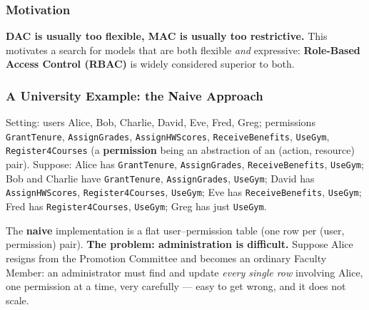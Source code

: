 \documentclass[12pt, a4paper]{article}
\begin{document}
\subsubsection{Motivation}
\textcolor{blue!50!black}{\textbf{DAC is usually too flexible, MAC is usually too restrictive.}} This motivates a search for models that are both flexible \emph{and} expressive: \textbf{Role-Based Access Control (RBAC)} is widely considered superior to both.

\subsubsection{A University Example: the Naive Approach}
Setting: users Alice, Bob, Charlie, David, Eve, Fred, Greg; permissions \texttt{GrantTenure}, \texttt{AssignGrades}, \texttt{AssignHWScores}, \texttt{ReceiveBenefits}, \texttt{UseGym}, \texttt{Register4Courses} (a \textbf{permission} being an abstraction of an (action, resource) pair). Suppose: Alice has \texttt{GrantTenure}, \texttt{AssignGrades}, \texttt{ReceiveBenefits}, \texttt{UseGym}; Bob and Charlie have \texttt{GrantTenure}, \texttt{AssignGrades}, \texttt{UseGym}; David has \texttt{AssignHWScores}, \texttt{Register4Courses}, \texttt{UseGym}; Eve has \texttt{ReceiveBenefits}, \texttt{UseGym}; Fred has \texttt{Register4Courses}, \texttt{UseGym}; Greg has just \texttt{UseGym}.

The \textbf{naive} implementation is a flat user--permission table (one row per (user, permission) pair). \textcolor{red!70!black}{\textbf{The problem: administration is difficult.}} Suppose Alice resigns from the Promotion Committee and becomes an ordinary Faculty Member: an administrator must find and update \emph{every single row} involving Alice, one permission at a time, very carefully --- easy to get wrong, and it does not scale.
\end{document}
